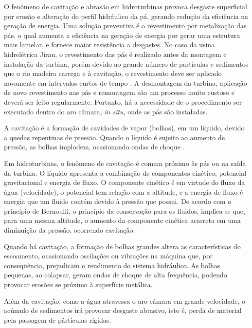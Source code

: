 O fenômeno de cavitação e abrasão em hidroturbinas provoca desgaste
superficial por erosão e alteração do perfil
hidráulico da pá, gerando redução da eficiência na geração de energia.
Uma solução preventiva é o revestimento por metalização das pás, o qual aumenta a eficiência na
geração de energia por gerar uma estrutura mais lamelar, e fornece maior
resistência a desgastes. No caso da usina hidrelétrica Jirau, o revestimento
das pás é realizado antes da montagem e instalação da turbina, porém devido ao grande número de
partículas e sedimentos que o rio madeira carrega e à cavitação, o revestimento
deve ser aplicado novamente em intervalos curtos de tempo
\citep{santa2009slurry}. A desmontagem da turbina, aplicação de novo
revestimento nas pás e remontagem são um processo muito custoso e deverá ser
feito regularmente. Portanto, há a necessidade de o procedimento ser
executado dentro do aro câmara, \textit{in situ}, onde as pás são instaladas.

A cavitação é a formação de cavidades de vapor (bolhas), em um líquido, devido a
quedas repentinas de pressão. Quando o líquido é sujeito ao aumento de pressão,
as bolhas implodem, ocasionando ondas de choque \citep{brennen2013cavitation}.

Em hidroturbinas, o fenômeno de cavitação é comum próximo às pás ou
na saída da turbina. O líquido apresenta a combinação
de componentes cinético, potencial gra\-vitacional e energia de fluxo. O
componente cinético é em virtude do fluxo da água (velocidade), o potencial tem
relação com a altitude, e a energia de fluxo é energia que um fluido contém
devido à pressão que possui. De acordo com o princípio de Bernoulli, o princípio
da conservação para os fluidos, implica-se que, para uma mesma altitude, o
aumento da componente cinética acarreta em uma diminuição da pressão, ocorrendo
cavitação. 

Quando há cavitação, a formação de bolhas grandes altera as características do
escoamento, ocasionando oscilações ou vibrações na máquina que, por
conseqüência, prejudicam o rendimento do sistema hidráulico. As bolhas
pequenas, ao colapsar, geram ondas de choque de alta frequência, podendo provocar erosões se
próximo à superfície metálica.

Além da cavitação, como a água atravessa o aro câmara em grande velocidade, o
acúmulo de sedimentos irá provocar desgaste abrasivo, isto é, perda de material
pela passagem de párticulas rígidas. 

